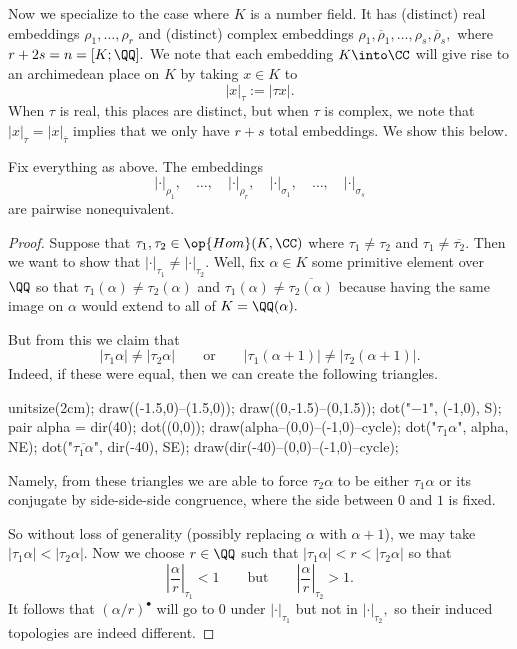 \documentclass[../notes.tex]{subfiles}
\begin{document}
Now we specialize to the case where $K$ is a number field. It has (distinct) real embeddings $\rho_1,\ldots,\rho_r$ and (distinct) complex embeddings $\rho_1,\overline\rho_1,\ldots,\rho_s,\overline\rho_s,$ where $r+2s=n=[K;\QQ].$ We note that each embedding $K\into\CC$ will give rise to an archimedean place on $K$ by taking $x\in K$ to
\[|x|_\tau:=|\tau x|.\]
When $\tau$ is real, this places are distinct, but when $\tau$ is complex, we note that $|x|_\tau=|x|_{\overline\tau}$ implies that we only have $r+s$ total embeddings. We show this below.
\begin{proposition}
	Fix everything as above. The embeddings
	\[|\cdot|_{\rho_1},\quad\ldots,\quad|\cdot|_{\rho_r},\quad|\cdot|_{\sigma_1},\quad\ldots,\quad|\cdot|_{\sigma_s}\]
	are pairwise nonequivalent.
\end{proposition}
\begin{proof}
	Suppose that $\tau_1,\tau_2\in\op{Hom}(K,\CC)$ where $\tau_1\ne\tau_2$ and $\tau_1\ne\overline{\tau_2}.$ Then we want to show that $|\cdot|_{\tau_1}\ne|\cdot|_{\tau_2}.$ Well, fix $\alpha\in K$ some primitive element over $\QQ$ so that $\tau_1(\alpha)\ne\tau_2(\alpha)$ and $\tau_1(\alpha)\ne\overline{\tau_2(\alpha)}$ because having the same image on $\alpha$ would extend to all of $K=\QQ(\alpha).$

	But from this we claim that
	\[|\tau_1\alpha|\ne|\tau_2\alpha|\qquad\text{or}\qquad|\tau_1(\alpha+1)|\ne|\tau_2(\alpha+1)|.\]
	Indeed, if these were equal, then we can create the following triangles.
	\begin{center}
		\begin{asy}
			unitsize(2cm);
			draw((-1.5,0)--(1.5,0));
			draw((0,-1.5)--(0,1.5));
			dot("$-1$", (-1,0), S);
			pair alpha = dir(40);
			dot((0,0));
			draw(alpha--(0,0)--(-1,0)--cycle);
			dot("$\tau_1\alpha$", alpha, NE);
			dot("$\overline{\tau_1\alpha}$", dir(-40), SE);
			draw(dir(-40)--(0,0)--(-1,0)--cycle);
		\end{asy}
	\end{center}
	Namely, from these triangles we are able to force $\tau_2\alpha$ to be either $\tau_1\alpha$ or its conjugate by side-side-side congruence, where the side between $0$ and $1$ is fixed.

	So without loss of generality (possibly replacing $\alpha$ with $\alpha+1$), we may take $|\tau_1\alpha|<|\tau_2\alpha|.$ Now we choose $r\in\QQ$ such that $|\tau_1\alpha|<r<|\tau_2\alpha|$ so that
	\[\left|\frac{\alpha}r\right|_{\tau_1}<1\qquad\text{but}\qquad\left|\frac{\alpha}r\right|_{\tau_2}>1.\]
	It follows that $(\alpha/r)^\bullet$ will go to $0$ under $|\cdot|_{\tau_1}$ but not in $|\cdot|_{\tau_2},$ so their induced topologies are indeed different.
\end{proof}
\end{document}
